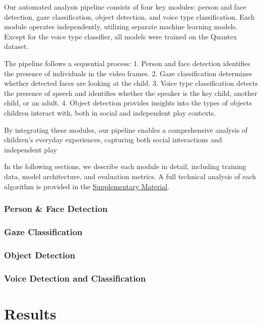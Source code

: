 \documentclass[
  man,floatsintext]{apa6}
\begin{document}
Our automated analysis pipeline consists of four key modules: person and face detection, gaze classification, object detection, and voice type classification. Each module operates independently, utilizing separate machine learning models. Except for the voice type classifier, all models were trained on the Quantex dataset.

The pipeline follows a sequential process:
1. Person and face detection identifies the presence of individuals in the video frames.
2. Gaze classification determines whether detected faces are looking at the child.
3. Voice type classification detects the presence of speech and identifies whether the speaker is the key child, another child, or an adult.
4. Object detection provides insights into the types of objects children interact with, both in social and independent play contexts.

By integrating these modules, our pipeline enables a comprehensive analysis of children's everyday experiences, capturing both social interactions and independent play

In the following sections, we describe each module in detail, including training data, model architecture, and evaluation metrics. A full technical analysis of each algorithm is provided in the \hyperref[supplementary-material]{Supplementary Material}.

\subsubsection{Person \& Face Detection}\label{person-face-detection}

\subsubsection{Gaze Classification}\label{gaze-classification}

\subsubsection{Object Detection}\label{object-detection}

\subsubsection{Voice Detection and Classification}\label{voice-detection-and-classification}

\section{Results}\label{results}
\end{document}
